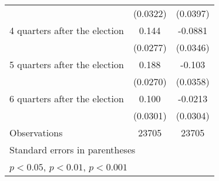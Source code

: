 \begin{table}[htbp]
\begin{tabular}{l*{2}{c}}
                    &    (0.0322)         &    (0.0397)         \\
[1em]
 4 quarters after the election&       0.144\sym{***}&     -0.0881\sym{*}  \\
                    &    (0.0277)         &    (0.0346)         \\
[1em]
 5 quarters after the election&       0.188\sym{***}&      -0.103\sym{**} \\
                    &    (0.0270)         &    (0.0358)         \\
[1em]
 6 quarters after the election&       0.100\sym{***}&     -0.0213         \\
                    &    (0.0301)         &    (0.0304)         \\
\hline
Observations        &       23705         &       23705         \\
\hline\hline
\multicolumn{3}{l}{\footnotesize Standard errors in parentheses}\\
\multicolumn{3}{l}{\footnotesize \sym{*} \(p<0.05\), \sym{**} \(p<0.01\), \sym{***} \(p<0.001\)}\\
\end{tabular}
\end{table}

